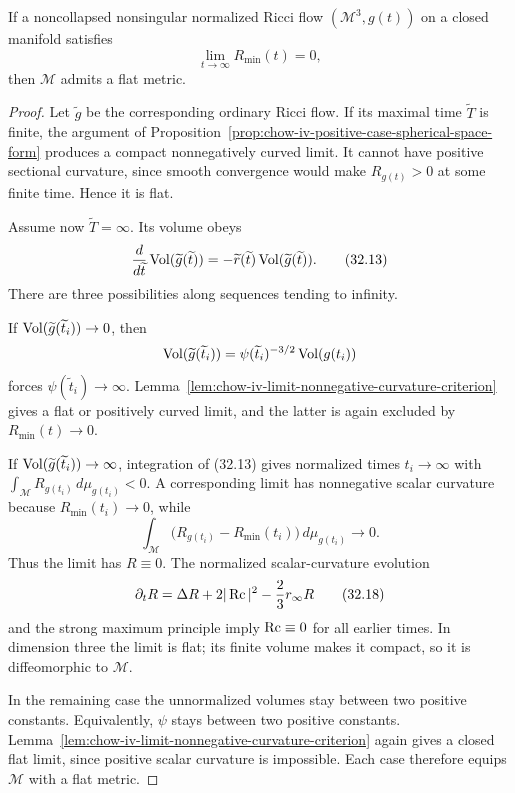 \begin{proposition}
\label{prop:chow-iv-zero-case-flat-metric}
If a noncollapsed nonsingular normalized Ricci flow
$(\mathcal M^3,g(t))$ on a closed manifold satisfies
\[
 \lim_{t\to\infty}R_{\min}(t)=0,
\]
then $\mathcal M$ admits a flat metric.
\end{proposition}
\begin{proof}
Let $\widetilde g$ be the corresponding ordinary Ricci flow.  If its
maximal time $\widetilde T$ is finite, the argument of
Proposition~\ref{prop:chow-iv-positive-case-spherical-space-form} produces a
compact nonnegatively curved limit.  It cannot have positive sectional
curvature, since smooth convergence would make $R_{g(t)}>0$ at some finite
time.  Hence it is flat.

Assume now $\widetilde T=\infty$.  Its volume obeys
\begin{equation*}
 \frac d{d\widetilde t}\operatorname{Vol}(\widetilde g(\widetilde t))
 =-\widetilde r(\widetilde t)\operatorname{Vol}(\widetilde g(\widetilde t)).
 \tag{32.13}
\end{equation*}
There are three possibilities along sequences tending to infinity.

If $\operatorname{Vol}(\widetilde g(\widetilde t_i))\to0$, then
\[
 \operatorname{Vol}(\widetilde g(\widetilde t_i))
 =\psi(\widetilde t_i)^{-3/2}\operatorname{Vol}(g(t_i))
\]
forces $\psi(\widetilde t_i)\to\infty$.  Lemma~\ref{lem:chow-iv-limit-nonnegative-curvature-criterion}
gives a flat or positively curved limit, and the latter is again excluded by
$R_{\min}(t)\to0$.

If $\operatorname{Vol}(\widetilde g(\widetilde t_i))\to\infty$, integration of (32.13)
gives normalized times $t_i\to\infty$ with
$\int_{\mathcal M}R_{g(t_i)}\,d\mu_{g(t_i)}<0$.  A corresponding limit has
nonnegative scalar curvature because $R_{\min}(t_i)\to0$, while
\[
 \int_{\mathcal M}
 \bigl(R_{g(t_i)}-R_{\min}(t_i)\bigr)\,d\mu_{g(t_i)}\longrightarrow0.
\]
Thus the limit has $R\equiv0$.  The normalized scalar-curvature evolution
\[
 \partial_tR=\Delta R+2|\operatorname{Rc}|^2-\frac23r_\infty R
 \tag{32.18}
\]
and the strong maximum principle imply $\operatorname{Rc}\equiv0$ for all earlier times.
In dimension three the limit is flat; its finite volume makes it compact,
so it is diffeomorphic to $\mathcal M$.

In the remaining case the unnormalized volumes stay between two positive
constants.  Equivalently, $\psi$ stays between two positive constants.
Lemma~\ref{lem:chow-iv-limit-nonnegative-curvature-criterion} again gives a
closed flat limit, since positive scalar curvature is impossible.  Each
case therefore equips $\mathcal M$ with a flat metric.
\end{proof}

